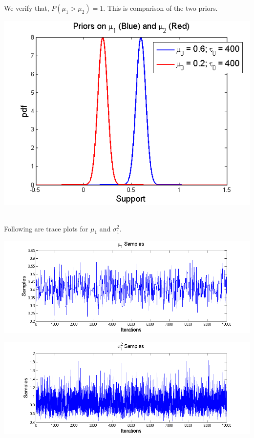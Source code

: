 \documentclass{article}
\begin{document}
We verify that, $P(\mu_1 > \mu_2) = 1.$ This is comparison of the two priors.
\begin{center}
\includegraphics[scale=0.75]{mu1mu2Priors.png}\\
\end{center}

\pagebreak
{}\\

Following are trace plots for $\mu_1$ and $\sigma_1^2.$\\

\begin{center}
\includegraphics[scale=0.75]{mu1Samples.png}\\
\end{center}

\begin{center}
\includegraphics[scale=0.75]{S12Samples.png}\\
\end{center}
\end{document}
